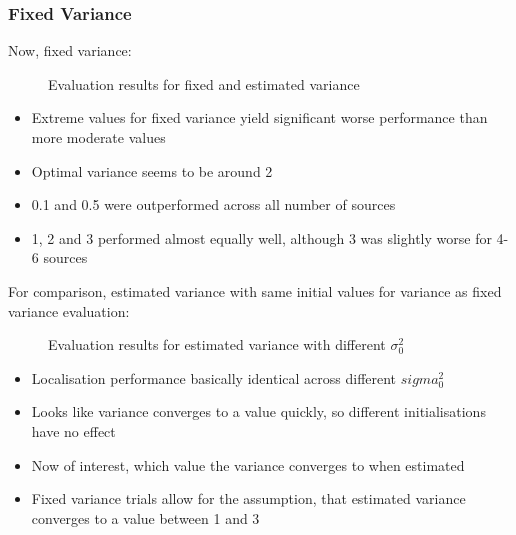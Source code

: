 \subsubsection{Fixed Variance}

Now, fixed variance:

\begin{figure}[H]
    \setlength\figureheight{7cm}
    \small
    \setlength\figurewidth{\textwidth}
	\centering
	\begin{tikzpicture}
	    \footnotesize
	    
	    
	\end{tikzpicture}
	
	\caption{Evaluation results for fixed and estimated variance}
	\label{fig:boxplotVariance}
\end{figure}

\begin{itemize}
    \item Extreme values for fixed variance yield significant worse performance than more moderate values
    \item Optimal variance seems to be around 2
    \item 0.1 and 0.5 were outperformed across all number of sources
    \item 1, 2 and 3 performed almost equally well, although 3 was slightly worse for 4-6 sources
\end{itemize}

For comparison, estimated variance with same initial values for variance as fixed variance evaluation:
\begin{figure}[H]
    \setlength\figureheight{7cm}
    \small
    \setlength\figurewidth{\textwidth}
	\centering
	\begin{tikzpicture}
	    \footnotesize
	    
	    
	    
	\end{tikzpicture}
	
	\caption{Evaluation results for estimated variance with different $\sigma^2_0$}
	\label{fig:boxplotVariance}
\end{figure}

\begin{itemize}
    \item Localisation performance basically identical across different $sigma^2_0$
    \item Looks like variance converges to a value quickly, so different initialisations have no effect
    \item Now of interest, which value the variance converges to when estimated
    \item Fixed variance trials allow for the assumption, that estimated variance converges to a value between 1 and 3
\end{itemize}
